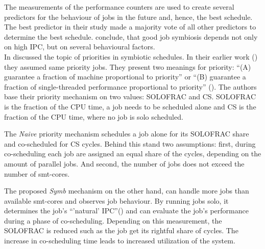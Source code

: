The measurements of the performance counters are used to create several
predictors for the behaviour of jobs in the future and, hence, the best schedule.
The best predictor in their study made a majority vote of all other predictors
to determine the best schedule.
\citeauthor{snavely_symbiotic_2000} conclude, that good job symbiosis depends
not only on high IPC, but on several behavioural factors.
\\


In \citeyear{snavely_symbiotic_2002} \citeauthor{snavely_symbiotic_2002}
discussed the topic of priorities in symbiotic schedules.
In their earlier work (\cite{snavely_symbiotic_2000}) they assumed same
priority jobs.
They present two meanings for priority: ``(A) guarantee a fraction of machine
proportional to priority'' or ``(B) guarantee a fraction of single-threaded
performance proportional to priority'' (\cite{snavely_symbiotic_2002}).
The authors base their priority mechanism on two values: SOLOFRAC and CS.
SOLOFRAC is the fraction of the CPU time, a job needs to be scheduled alone
and CS is the fraction of the CPU time, where no job is solo scheduled.

The \textit{Naive} priority mechanism schedules a job alone for its SOLOFRAC
share and co-scheduled for CS cycles. Behind this stand two assumptions: first,
during co-scheduling each job are assigned an equal share of the cycles,
depending on the amount of parallel jobs. And second, the number of jobs does
not exceed the number of \gls{smt}-cores.

The proposed \textit{Symb} mechanism on the other hand, can handle more jobs
than available \gls{smt}-cores and observes job behaviour. By running jobs
solo, it determines the job's ``'natural' IPC''(\cite{snavely_symbiotic_2002})
and can evaluate the job's performance during a phase of co-scheduling.
Depending on this measurement, the SOLOFRAC is reduced such as the job get its
rightful share of cycles. The increase in co-scheduling time leads to increased
utilization of the system.



